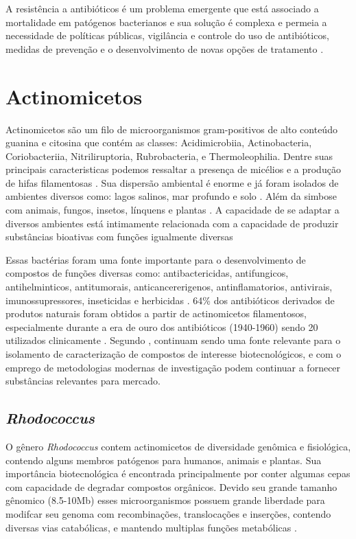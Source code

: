 A resistência a antibióticos é um problema emergente que está associado a mortalidade em patógenos bacterianos e sua solução
é complexa e permeia a necessidade de políticas públicas, vigilância e controle do uso de antibióticos, medidas de prevenção 
e o desenvolvimento de novas opções de tratamento \cite{frieri2017antibiotic}.  

\section{Actinomicetos}

Actinomicetos são um filo de microorganismos gram-positivos de alto conteúdo
guanina e citosina que contém as classes: Acidimicrobiia, Actinobacteria, 
Coriobacteriia, Nitriliruptoria, Rubrobacteria, e Thermoleophilia\cite{yadav2018}.
Dentre suas principais caracteristicas podemos ressaltar a presença de micélios
e a produção de hifas filamentosas \cite{chater2016}. Sua dispersão ambiental é enorme
e já foram isolados de ambientes diversos como: lagos salinos, mar profundo e solo \cite{flores2021,felicio2021,sapkota2020}.
Além da simbose com animais, fungos, insetos, línquens e plantas \cite{hei2021,van2017}.
A capacidade de se adaptar a diversos ambientes está intimamente relacionada com a capacidade
de produzir substâncias bioativas com funções igualmente diversas  \cite{van2020}

Essas bactérias foram uma fonte importante para o desenvolvimento de compostos de funções
diversas como: antibactericidas, antifungicos, antihelminticos, antitumorais, anticancererigenos,
antinflamatorios, antivirais, imunossupressores, inseticidas e herbicidas \cite{demain2009,jose2021}. 
64\% dos antibióticos derivados de produtos naturais foram obtidos a partir de actinomicetos filamentosos,
especialmente durante a era de ouro dos antibióticos (1940-1960) sendo 20 utilizados clinicamente \cite{hutchings2019} .
Segundo , continuam sendo uma fonte relevante
para o isolamento de caracterização de compostos de interesse biotecnológicos, e com o
emprego de metodologias modernas de investigação podem continuar a fornecer
substâncias relevantes para mercado. 


\subsection{\textit{Rhodococcus}}
O gênero \textit{Rhodococcus} contem actinomicetos de diversidade genômica e fisiológica,
contendo alguns membros patógenos para humanos, animais e plantas. Sua importância biotecnológica
é encontrada principalmente por conter algumas cepas com capacidade de degradar compostos orgânicos.
Devido seu grande tamanho gênomico (8.5-10Mb) esses microorganismos possuem grande liberdade
para modifcar seu genoma com recombinações, translocações e inserções, contendo diversas vias catabólicas,
e mantendo multiplas funções metabólicas \cite{cappelletti2019}.

